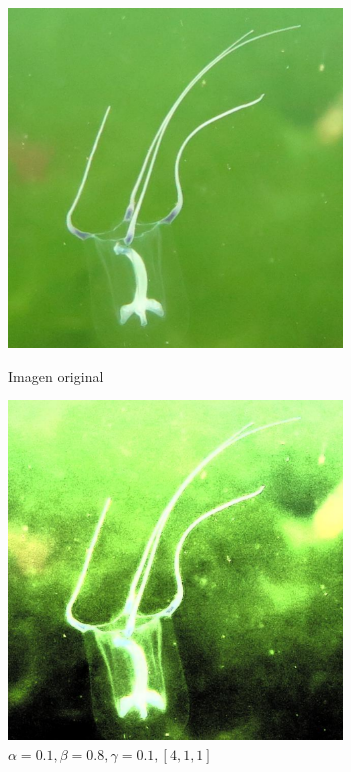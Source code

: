\begin{figure}[H]
\begin{minipage}[c]{0.48\linewidth}
  \includegraphics[height=9cm]{imgs/1901xx.pdf}
  \caption{Imagen original}
\end{minipage}
\hfill
\begin{minipage}[c]{0.48\linewidth}
  \includegraphics[height=9cm]{imgs/1901xxOut.pdf}
    \caption{$\alpha = 0.1, \beta = 0.8, \gamma = 0.1, [4, 1, 1]$}
\end{minipage}%
\end{figure}

